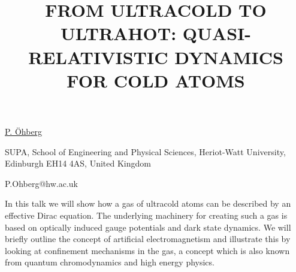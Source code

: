 \title{FROM ULTRACOLD TO ULTRAHOT: QUASI-RELATIVISTIC DYNAMICS FOR COLD ATOMS}

\underline{P. \"{O}hberg} 

{\normalsize{\vspace{-4mm}
SUPA, School of Engineering and Physical Sciences, Heriot-Watt University, Edinburgh EH14 4AS, United Kingdom

\email P.Ohberg@hw.ac.uk}}

In this talk we will show how a gas of ultracold atoms can be described by an effective Dirac equation. The underlying machinery for
creating such a gas is based on optically induced gauge potentials and dark state dynamics. We will briefly outline the concept of
artificial electromagnetism and illustrate this by looking at confinement mechanisms in the gas, a concept which is also known from
quantum chromodynamics and high energy physics.

\vspace{\baselineskip} 